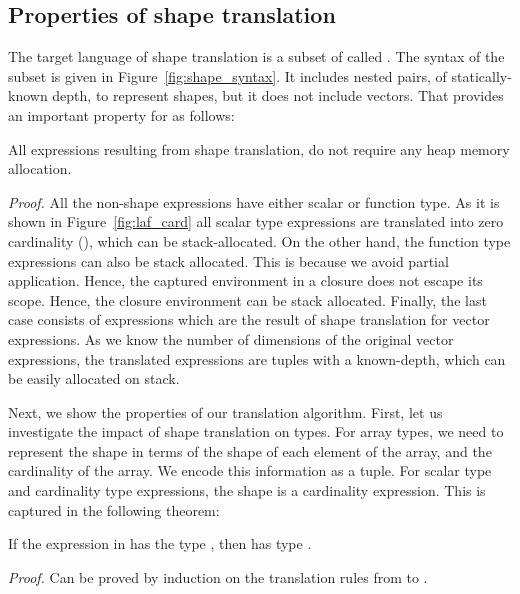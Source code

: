 \subsection{Properties of shape translation}
\label{sec:shape-properties}

The target language of shape translation is a subset of \salafsharp{} called \shapefsmooth{}.
The syntax of the subset is given in Figure~\ref{fig:shape_syntax}. It includes nested pairs, of statically-known depth, to represent shapes, but it does not include vectors.
That provides an important property for \shapefsmooth{} as follows:

\begin{theorems}
\label{theorcardheap}
All expressions resulting from shape translation, do not require any heap memory allocation.
\end{theorems}
\textit{Proof.} All the non-shape expressions have either scalar or function type. As it is shown in Figure~\ref{fig:laf_card} all scalar type expressions are translated into zero cardinality (\cardempty), which can be stack-allocated. On the other hand, the function type expressions can also be stack allocated. This is because we avoid partial application. Hence, the captured environment in a closure does not escape its scope. Hence, the closure environment can be stack allocated. Finally, the last case consists of expressions which are the result of shape translation for vector expressions. As we know the number of dimensions of the original vector expressions, the translated expressions are tuples with a known-depth, which can be easily allocated on stack. 

Next, we show the properties of our translation algorithm. First, let us investigate the impact of shape translation on \lafsharp{} types. For array types, we need to represent the shape in terms of the shape of each element of the array, and the cardinality of the array. We encode this information as a tuple. For scalar type and cardinality type expressions, the shape is a cardinality expression. This is captured in the following theorem:

\begin{theorems}
\label{theorcardtype}
If the expression \expr{} in \lafsharp{} has the type \typet{}, then \cardtrans{\expr} has type \cardtranstype{\typet}.
\end{theorems}
\textit{Proof.} Can be proved by induction on the translation rules from \lafsharp{} to \shapefsmooth{}.


